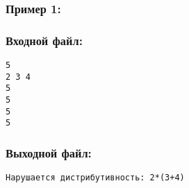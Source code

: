 \documentclass[11pt,a4paper,oneside]{article}
\begin{document}
\subsubsection*{Пример 1:}
\begin{minipage}[t]{.5\textwidth}
\subsubsection*{Входной файл:}
\begin{verbatim}
5
2 3 4
5
5
5
5
\end{verbatim}
\end{minipage}
\begin{minipage}[t]{.5\textwidth}
\subsubsection*{Выходной файл:}
\begin{verbatim}
Нарушается дистрибутивность: 2*(3+4)
\end{verbatim}
\end{minipage}



\end{document}
